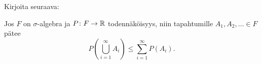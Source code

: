     \begin{harj}
        Kirjoita seuraava:
        \begin{sample}
            Jos \(F\) on \(\sigma\)-algebra ja \(P\colon F\to\mathbb{R}\) todennäköisyys, niin tapahtumille \(A_1,A_2,\dotsc\in F\) pätee
            \[
                P\left(\bigcup_{i=1}^\infty A_i\right) \leq \sum_{i=1}^\infty P(A_i).
            \]
        \end{sample}
    \end{harj}

